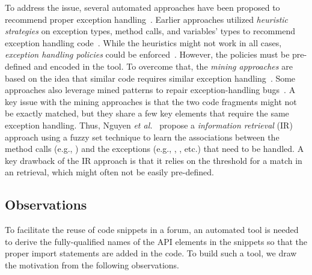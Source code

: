 
To address the issue, several automated approaches have been proposed
to recommend proper exception
handling~\cite{xrank-fse20,barbosa-bsse12,chanchal-scam14,barbosa-tse18,barbosa-tse16}. Earlier
approaches utilized {\em heuristic strategies} on exception types,
method calls, and variables' types to recommend exception handling
code~\cite{barbosa-bsse12}. While the heuristics might not work in all
cases, {\em exception handling policies} could be
enforced~\cite{barbosa-tse16,barbosa-saner18}. However, the policies
must be pre-defined and encoded in the tool. To overcome that, the
{\em mining approaches} are based on the idea that similar code
requires similar exception handling~\cite{chanchal-scam14}. Some
approaches also leverage mined patterns to repair exception-handling
bugs~\cite{zhong-jss18}. A key issue with the mining approaches is
that the two code fragments might not be exactly matched, but they
share a few key elements that require the same exception handling.
Thus, Nguyen {\em et al.}~\cite{xrank-fse20} propose a {\em
  information retrieval} (IR) approach using a fuzzy set technique to
learn the associations between the method calls (e.g.,
) and the exceptions (e.g.,
, , etc.)
that need to be handled. A key drawback of the IR approach is that it
relies on the threshold for a match in an retrieval, which might often
not be easily pre-defined.







\subsection{Observations}
\label{sec:obs}

To facilitate the reuse of code snippets in a forum, an automated tool
is needed to derive the fully-qualified names of the API elements in
the snippets so that the proper import statements are added in the
code. To build such a tool, we draw the motivation from the following
observations.

